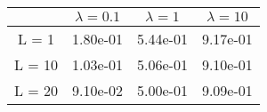 \begin{tabular}{cccc}
& $\lambda = 0.1$ & $\lambda = 1$ & $\lambda = 10$ \\
\hline
L = 1 & 1.80e-01 & 5.44e-01 & 9.17e-01 \\
L = 10 & 1.03e-01 & 5.06e-01 & 9.10e-01 \\
L = 20 & 9.10e-02 & 5.00e-01 & 9.09e-01 \\
\hline
\end{tabular}
